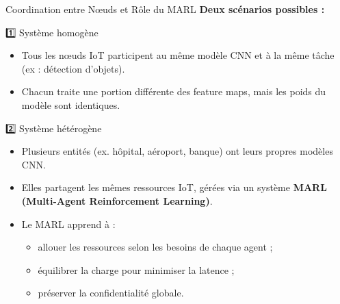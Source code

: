 \documentclass{beamer}
\begin{document}
\begin{frame}{Coordination entre Nœuds et Rôle du MARL}
\textbf{Deux scénarios possibles :}
\begin{block}{1️⃣ Système homogène}
\begin{itemize}
    \item Tous les nœuds IoT participent au même modèle CNN et à la même tâche (ex : détection d’objets).
    \item Chacun traite une portion différente des feature maps, mais les poids du modèle sont identiques.
\end{itemize}
\end{block}

\begin{block}{2️⃣ Système hétérogène}
\begin{itemize}
    \item Plusieurs entités (ex. hôpital, aéroport, banque) ont leurs propres modèles CNN.
    \item Elles partagent les mêmes ressources IoT, gérées via un système \textbf{MARL (Multi-Agent Reinforcement Learning)}.
    \item Le MARL apprend à :
    \begin{itemize}
        \item allouer les ressources selon les besoins de chaque agent ;
        \item équilibrer la charge pour minimiser la latence ;
        \item préserver la confidentialité globale.
    \end{itemize}
\end{itemize}
\end{block}
\end{frame}
\end{document}
